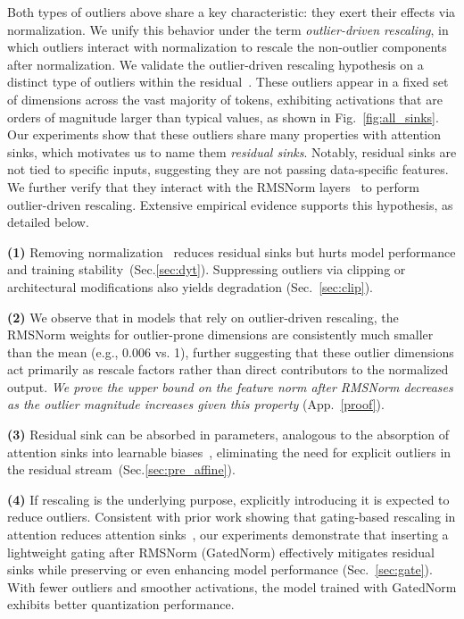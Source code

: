 \documentclass{article} %
\begin{document}
Both types of outliers above share a key characteristic: they exert their effects via normalization. We unify this behavior under the term \textit{outlier-driven rescaling}, in which outliers interact with normalization to rescale the non-outlier components after normalization. 
We validate the outlier-driven rescaling hypothesis on a distinct type of outliers within the residual~\citep{dettmers2022gpt3,bondarenko2023quantizable}.
These outliers appear in a fixed set of dimensions across the vast majority of tokens, exhibiting activations that are orders of magnitude larger than typical values, as shown in Fig.~\ref{fig:all_sinks}.
Our experiments show that these outliers share many properties with attention sinks, which motivates us to name them \textit{residual sinks}. 
Notably, residual sinks are not tied to specific inputs, suggesting they are not passing data-specific features.
We further verify that they interact with the RMSNorm layers~\citep{zhang2019root} to perform outlier-driven rescaling. 
Extensive empirical evidence supports this hypothesis, as detailed below.  


\textbf{(1)} Removing normalization~\citep{zhu2025transformers} reduces residual sinks but hurts model performance and training stability~(Sec.\ref{sec:dyt}). 
Suppressing outliers via clipping or architectural modifications also yields degradation (Sec.~\ref{sec:clip}).

\textbf{(2)} We observe that in models that rely on outlier-driven rescaling, the RMSNorm weights for outlier-prone dimensions are consistently much smaller than the mean (e.g., 0.006 vs. 1), further suggesting that these outlier dimensions act primarily as rescale factors rather than direct contributors to the normalized output.
\textit{We prove the upper bound on the feature norm after RMSNorm decreases as the outlier magnitude increases given this property }(App.~\ref{proof}).

\textbf{(3)} Residual sink can be absorbed in parameters, analogous to the absorption of attention sinks into learnable biases~\citep{sun2024massive,agarwal2025gpt}, eliminating the need for explicit outliers in the residual stream~(Sec.\ref{sec:pre_affine}). 


\textbf{(4)} If rescaling is the underlying purpose, explicitly introducing it is expected to reduce outliers.
Consistent with prior work showing that gating-based rescaling in attention reduces attention sinks~\citep{bondarenko2023quantizable,an2025systematic,qiu2025gated}, our experiments demonstrate that inserting a lightweight gating after RMSNorm (GatedNorm) effectively mitigates residual sinks while preserving or even enhancing model performance (Sec.~\ref{sec:gate}).
With fewer outliers and smoother activations, the model trained with GatedNorm exhibits better quantization performance.
\end{document}
